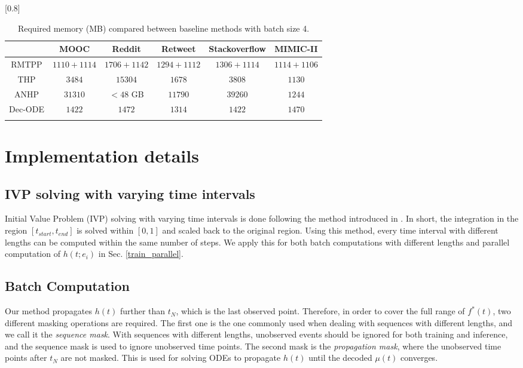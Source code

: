    \begin{table}[h]
    \renewcommand{\arraystretch}{1.1}
    \centering
    \caption{Required memory (MB) compared between baseline methods with batch size 4.}
    
    \scalebox{0.8}[0.8]{
    \begin{tabular}{c| c| c | c | c | c } \Xhline{0.3ex}
    & \multicolumn{1}{c|}{MOOC} & \multicolumn{1}{c|}{Reddit} & \multicolumn{1}{c|}{Retweet} & \multicolumn{1}{c|}{Stackoverflow} & \multicolumn{1}{c}{MIMIC-II}\\[-2pt]
    \hline
    RMTPP & $1110 + 1114$ & $1706 + 1142$ & $1294 + 1112$ & $1306 + 1114$ & $1114 + 1106$ \\
    THP & $3484$ & $15304$ & $1678$ & $3808$ & $1130$ \\
    ANHP & $31310$ & $< 48$ GB & $11790$ &$39260$ & $1244$ \\
    Dec-ODE & $1422$ & $1472$ & $1314$ & $1422$ & $1470$\\
    \Xhline{0.3ex}      
    \end{tabular}
    }
        \label{tab:epoch_memory}
    \end{table}
\section{Implementation details}

\subsection{IVP solving with varying time intervals \label{appen: varied time}} 
Initial Value Problem (IVP) solving with varying time intervals is done following the method introduced in \cite{bib:STPP}.
In short, the integration in the region $[t_{start}, t_{end}]$ is solved within $[0, 1]$ and scaled back to the original region. 
Using this method, every time interval with different lengths can be computed within the same number of steps.
We apply this for both batch computations with different lengths and parallel computation of $h(t;e_i)$ in Sec. \ref{train_parallel}.

\subsection{Batch Computation}
Our method propagates $h(t)$  further than $t_N$, which is the last observed point.
Therefore, in order to cover the full range of $f^*(t)$, two different masking operations are required.
The first one is the one commonly used when dealing with sequences with different lengths, and we call it the \textit{sequence mask}.
With sequences with different lengths, unobserved events should be ignored for both training and inference, and the sequence mask is used to ignore unobserved time points.
The second mask is the \textit{propagation mask}, where the unobserved time points after $t_N$ are not masked.
This is used for solving ODEs to propagate $h(t)$ until the decoded $\mu(t)$ converges.


